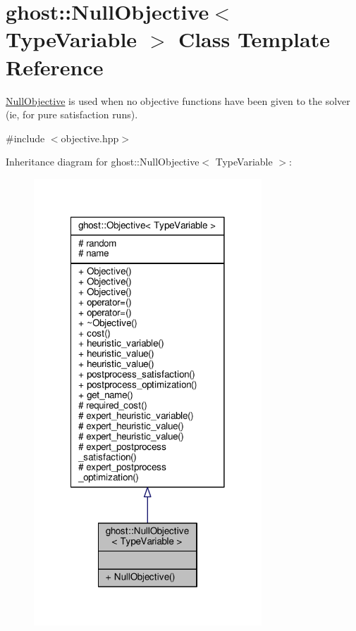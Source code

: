\hypertarget{classghost_1_1NullObjective}{\section{ghost\-:\-:Null\-Objective$<$ Type\-Variable $>$ Class Template Reference}
\label{classghost_1_1NullObjective}
}


\hyperlink{classghost_1_1NullObjective}{Null\-Objective} is used when no objective functions have been given to the solver (ie, for pure satisfaction runs).  




{\ttfamily \#include $<$objective.\-hpp$>$}



Inheritance diagram for ghost\-:\-:Null\-Objective$<$ Type\-Variable $>$\-:
\nopagebreak
\begin{figure}[H]
\begin{center}
\leavevmode
\includegraphics[width=242pt]{classghost_1_1NullObjective__inherit__graph}
\end{center}
\end{figure}


